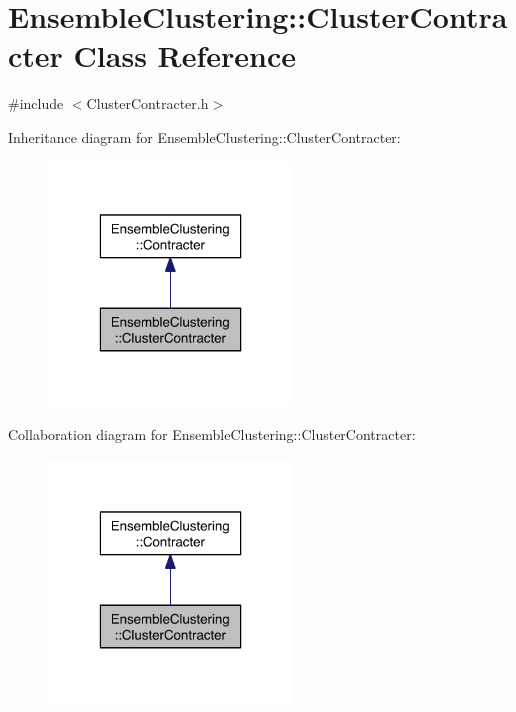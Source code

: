 \hypertarget{class_ensemble_clustering_1_1_cluster_contracter}{\section{Ensemble\-Clustering\-:\-:Cluster\-Contracter Class Reference}
\label{class_ensemble_clustering_1_1_cluster_contracter}
}


{\ttfamily \#include $<$Cluster\-Contracter.\-h$>$}



Inheritance diagram for Ensemble\-Clustering\-:\-:Cluster\-Contracter\-:\nopagebreak
\begin{figure}[H]
\begin{center}
\leavevmode
\includegraphics[width=184pt]{class_ensemble_clustering_1_1_cluster_contracter__inherit__graph}
\end{center}
\end{figure}


Collaboration diagram for Ensemble\-Clustering\-:\-:Cluster\-Contracter\-:\nopagebreak
\begin{figure}[H]
\begin{center}
\leavevmode
\includegraphics[width=184pt]{class_ensemble_clustering_1_1_cluster_contracter__coll__graph}
\end{center}
\end{figure}
